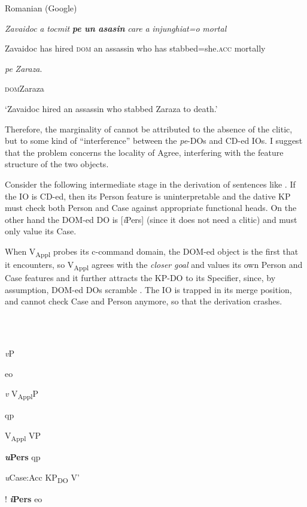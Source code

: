 \documentclass[output=paper,colorlinks,citecolor=brown]{./langscibook}
\begin{document}
          Romanian (Google)

\textit{Zavaidoc} \textit{a}   \textit{tocmit}  \textbf{\textit{pe}  \textit{un}  \textit{asasin}}  \textit{care} \textit{a}   \textit{injunghiat=o}   \textit{mortal} 

Zavaidoc has   hired   \textsc{dom} an assassin who has stabbed=she.\textsc{acc} mortally

\textit{pe}  \textit{Zaraza}.

\textsc{dom}Zaraza

  ‘Zavaidoc hired an assassin who stabbed Zaraza to death.’

Therefore, the marginality of  cannot be attributed to the absence of the clitic, but to some kind of “interference” between the \textit{pe}{}-DOs and CD-ed IOs. I suggest that the problem concerns the locality of Agree, interfering with the feature structure of the two objects.

Consider the following intermediate stage  in the derivation of sentences like . If the IO is CD-ed, then its Person feature is uninterpretable and the dative KP must check both Person and Case against appropriate functional heads. On the other hand the DOM-ed DO is [\textit{i}Pers] (since it does not need a clitic) and must only value its Case.

When V\textsubscript{Appl} probes its c-command domain, the DOM-ed object is the first that it encounters, so V\textsubscript{Appl} agrees with the \textit{closer} \textit{goal} and values its own Person and Case features and it further attracts the KP-DO to its Specifier, since, by assumption, DOM-ed DOs scramble \citep{López2012}. The IO is trapped in its merge position, and cannot check Case and Person anymore, so that the derivation crashes.

\ea%
    \label{ex:key:40}
    \gll\\
        \\
    \glt
    \z

        

  \textit{v}P

eo

\textit{v}    V\textsubscript{Appl}P

qp

  V\textsubscript{Appl}     VP

  \textbf{\textit{u}}\textbf{Pers}    qp

  \textit{u}Case:Acc  KP\textsubscript{DO} V’

  !    \textbf{\textit{i}}\textbf{Pers}    eo
\end{document}
